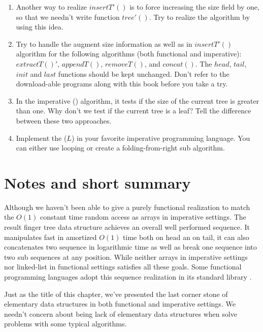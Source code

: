 \documentclass[UTF8]{article}
\begin{document}
\begin{Exercise}
\begin{enumerate}
\item Another way to realize $insertT'()$ is to force increasing the size field by one, so
that we needn't write function $tree'()$. Try to realize the algorithm by using this idea.

\item Try to handle the augment size information as well as in $insertT'()$ algorithm for
the following algorithms (both functional and imperative): $extractT()'$, $appendT()$, $removeT()$, and $concat()$. The $head$, $tail$,
$init$ and $last$ functions should be kept unchanged. Don't refer to the download-able
programs along with this book before you take a try.

\item In the imperative () algorithm, it tests if the size of the
current tree is greater than one. Why don't we test if the current tree is
a leaf? Tell the difference between these two approaches.

\item Implement the ($L$) in your favorite imperative programming language.
You can either use looping or create a folding-from-right sub algorithm.
\end{enumerate}
\end{Exercise}

\section{Notes and short summary}

Although we haven't been able to give a purely functional realization to match the
$O(1)$ constant time random access as arrays in imperative settings. The result
finger tree data structure achieves an overall well performed sequence.
It manipulates fast in amortized $O(1)$ time both on head an on tail, it can also
concatenates two sequence in logarithmic time as well as break one sequence into
two sub sequences at any position. While neither arrays in imperative settings
nor linked-list in functional settings satisfies all these goals.
Some functional programming languages adopt this sequence realization in its
standard library \cite{hackage-ftr}.

Just as the title of this chapter, we've presented the last corner stone of
elementary data structures in both functional and imperative settings.
We needn't concern about being lack of elementary data structures when
solve problems with some typical algorithms.
\end{document}
